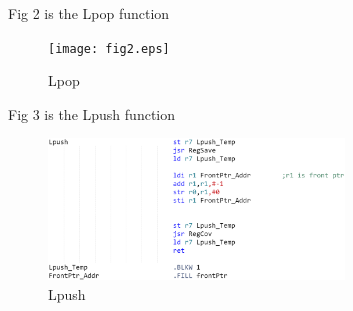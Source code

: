 \documentclass[twoside]{article}
\begin{document}
\begin{CJK*}{UTF8}{gbsn}
	
	Fig 2 is the Lpop function

	\begin{figure}[htbp]
		\small
		\centering
		\texttt{[image: fig2.eps]}
		\caption{Lpop} %
	\end{figure}


	Fig 3 is the Lpush function
	
	\begin{figure}[htbp]
		\small
		\centering
		\includegraphics[width=0.7\textwidth]{fig3.eps}
		\caption{Lpush} %
	\end{figure}

\end{CJK*}
\end{document}
